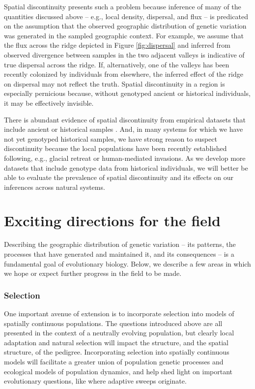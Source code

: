 \documentclass{ar-1col}
\begin{document}
Spatial discontinuity presents such a problem because 
inference of many of the quantities discussed above --  
e.g., local density, dispersal, and flux --
is predicated on the assumption that 
the observed geographic distribution of genetic variation 
was generated in the sampled geographic context.
For example, 
we assume that the flux across the ridge 
depicted in Figure \ref{fig:dispersal}
and inferred from observed divergence 
between samples in the two adjacent valleys 
is indicative of true dispersal across the ridge.
If, alternatively, one of the valleys 
has been recently colonized by individuals from elsewhere, 
the inferred effect of the ridge on dispersal may not reflect the truth.
Spatial discontinuity in a region is especially pernicious because, 
without genotyped ancient or historical individuals, 
it may be effectively invisible.

There is abundant evidence of spatial discontinuity 
from empirical datasets that include ancient or historical samples 
\citep{bi2013unlocking, skoglund2014investigating, PickrellReich2014, lazaridis_ancient_2014, haak2015massive, allentoft2015population, joseph2018inference}.
And, in many systems for which we have not yet genotyped historical samples, 
we have strong reason to suspect discontinuity 
because the local populations have been recently established 
following, e.g., glacial retreat or human-mediated invasions.
As we develop more datasets that include genotype data from historical individuals, 
we will better be able to evaluate the prevalence of spatial discontinuity 
and its effects on our inferences across natural systems. 


\section{Exciting directions for the field}

Describing the geographic distribution of genetic variation -- 
its patterns, 
the processes that have generated and maintained it, 
and its consequences -- 
is a fundamental goal of evolutionary biology.
Below, we describe a few areas 
in which we hope or expect further progress in the field to be made.

\subsubsection{Selection}
One important avenue of extension is to incorporate selection into 
models of spatially continuous populations. 
The questions introduced above are all presented in the context 
of a neutrally evolving population,
but clearly local adaptation and natural selection will impact 
the structure, and the spatial structure, of the pedigree.
Incorporating selection into spatially continuous models 
will facilitate a greater union of population genetic processes 
and ecological models of population dynamics, 
and help shed light on important evolutionary questions, 
like where adaptive sweeps originate. 
\end{document}
